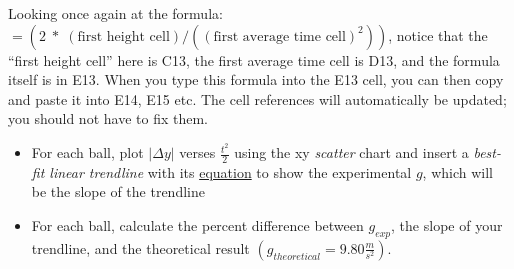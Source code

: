 Looking once again at the formula: $=(2 \; * \; (\text{first height cell}) / ((\text{first average time cell})^2))$, notice that
the “first height cell” here is C13, the first average time cell is D13, and the formula itself is in
E13. When you type this formula into the E13 cell, you can then copy and paste it into E14, E15
etc. The cell references will automatically be updated; you should not have to fix them.

\begin{itemize}
  \item For each ball, plot $|\Delta y|$ verses $\frac{t^2}{2}$ using the xy \emph{scatter}
    chart and insert a \emph{best-fit linear trendline} with its \underline{equation} to show the experimental
    $g$, which will be the slope of the trendline
  \item For each ball, calculate the percent difference between $g_{exp}$, the slope
    of your trendline, and the theoretical result $(g_{theoretical} = 9.80\frac{m}{s^2})$.
\end{itemize}
